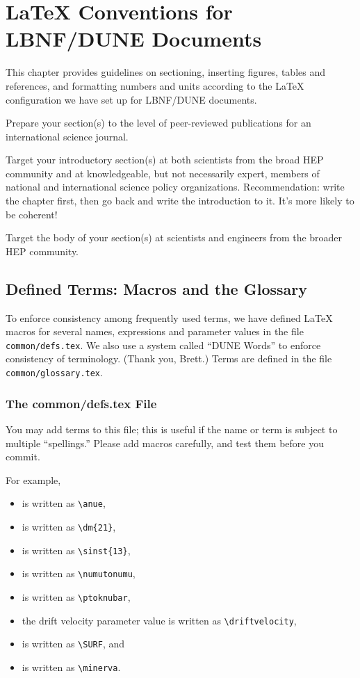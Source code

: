 
\chapter{\LaTeX{} Conventions for LBNF/DUNE Documents}
\label{ch:latex-stds}

This chapter provides guidelines on sectioning, inserting figures, tables and references, and formatting numbers and units according to the \LaTeX{} configuration we have set up for LBNF/DUNE documents.

Prepare your section(s) to the level of peer-reviewed publications for an international science journal.
 
Target your introductory section(s) at both scientists from the broad HEP community and at knowledgeable, but not necessarily expert, members of national and international science policy organizations. Recommendation: write the chapter first, then go back and write the introduction to it. It's more likely to be coherent!

Target the body of your section(s) at scientists and engineers from the broader HEP community.


\section{Defined Terms: Macros and the Glossary}
\label{sec:latex-terms}

To enforce consistency among frequently used terms, we have defined \LaTeX{} macros for several names, expressions and parameter values in the file \texttt{common/defs.tex}.  We also use a system called ``DUNE Words'' to enforce consistency of terminology. (Thank you, Brett.)  Terms are defined in the file \texttt{common/glossary.tex}.

\subsection{The common/defs.tex File}

You may add terms
to this file; this is useful if the name or term is subject
to multiple ``spellings.''  Please add macros carefully, and test them before you commit. 

For example,
\begin{itemize}
\item \anue is written as \verb|\anue|,
\item {} is written as \verb|\dm{21}|,
\item {} is written as \verb|\sinst{13}|,
\item \numutonumu is written as \verb|\numutonumu|,
\item \ptoknubar is written as \verb|\ptoknubar|,
\item the drift velocity parameter value \driftvelocity is written as \verb|\driftvelocity|,
\item \SURF is written as \verb|\SURF|, and
\item \minerva is written as \verb|\minerva|.
\end{itemize}

